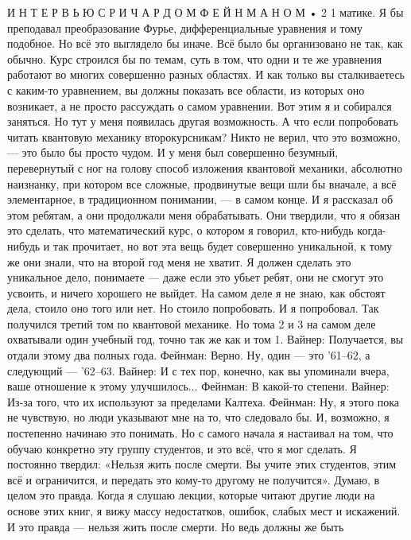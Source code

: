 \documentclass[10pt,oneside]{article}
\begin{document}
И Н Т Е Р В Ь Ю  С  Р И Ч А Р Д О М  Ф Е Й Н М А Н О М • 2 1 матике. Я бы преподавал преобразование Фурье, дифференциальные уравнения и тому подобное. Но всё это выглядело бы иначе. Всё было бы организовано не так, как обычно. Курс строился бы по темам, суть в том, что одни и те же уравнения работают во многих совершенно разных областях. И как только вы сталкиваетесь с каким-то уравнением, вы должны показать все области, из которых оно возникает, а не просто рассуждать о самом уравнении. Вот этим я и собирался заняться. Но тут у меня появилась другая возможность. А что если попробовать читать квантовую механику второкурсникам? Никто не верил, что это возможно, --- это было бы просто чудом. И у меня был совершенно безумный, перевернутый с ног на голову способ изложения квантовой механики, абсолютно наизнанку, при котором все сложные, продвинутые вещи шли бы вначале, а всё элементарное, в традиционном понимании, --- в самом конце. И я рассказал об этом ребятам, а они продолжали меня обрабатывать. Они твердили, что я обязан это сделать, что математический курс, о котором я говорил, кто-нибудь когда-нибудь и так прочитает, но вот эта вещь будет совершенно уникальной, к тому же они знали, что на второй год меня не хватит. Я должен сделать это уникальное дело, понимаете --- даже если это убьет ребят, они не смогут это усвоить, и ничего хорошего не выйдет. На самом деле я не знаю, как обстоят дела, стоило оно того или нет. Но стоило попробовать. И я попробовал. Так получился третий том по квантовой механике. Но тома 2 и 3 на самом деле охватывали один учебный год, точно так же как и том 1. Вайнер: Получается, вы отдали этому два полных года. Фейнман: Верно. Ну, один --- это '61–62, а следующий --- '62–63. Вайнер: И с тех пор, конечно, как вы упоминали вчера, ваше отношение к этому улучшилось... Фейнман: В какой-то степени. Вайнер: Из-за того, что их используют за пределами Калтеха. Фейнман: Ну, я этого пока не чувствую, но люди указывают мне на то, что следовало бы. И, возможно, я постепенно начинаю это понимать. Но с самого начала я настаивал на том, что обучаю конкретно эту группу студентов, и это всё, что я мог сделать. Я постоянно твердил: «Нельзя жить после смерти. Вы учите этих студентов, этим всё и ограничится, и передать это кому-то другому не получится». Думаю, в целом это правда. Когда я слушаю лекции, которые читают другие люди на основе этих книг, я вижу массу недостатков, ошибок, слабых мест и искажений. И это правда --- нельзя жить после смерти. Но ведь должны же быть\par
\end{document}
